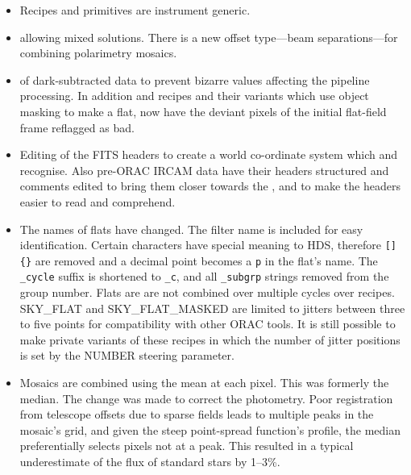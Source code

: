 \documentclass[twoside,11pt,nolof]{starlink}
\providecommand{\GAIA}{{\footnotesize GAIA}}
\providecommand{\KAPPA}{{\footnotesize KAPPA}}
\begin{document}
\begin{itemize}
   \item Recipes and primitives are instrument generic.
   \item {} allowing
      mixed solutions.  There is a new offset type---beam
      separa\-tions---for combining polarimetry mosaics.
   \item {} of dark-subtracted data
      to prevent bizarre values affecting the pipeline processing.
      In addition  and
       recipes and their variants which
      use object masking to make a flat, now have the deviant pixels of
      the initial flat-field frame reflagged as bad.
   \item Editing of the FITS headers to create a world co-ordinate
      system which \xref{\GAIA}{sun214}{} and \xref{\KAPPA}{sun95}{}
      recognise.  Also pre-ORAC IRCAM data have their headers
      structured and comments edited to bring them closer towards the
      ,
      and to make the headers easier to read and comprehend.
   \item The names of flats have changed.  The filter name is included
      for easy identification.  Certain characters have special
      meaning to HDS, therefore \texttt{[]\{\}} are removed and a decimal
      point becomes a \texttt{p} in the flat's name.  The {\tt{\_cycle}}
      suffix is shortened to {\tt{\_c}}, and all {\tt{\_subgrp}}
      strings removed from the group number.  Flats are are not
      combined over multiple cycles over recipes.  SKY\_FLAT and
      SKY\_FLAT\_MASKED are limited to jitters between three to five
      points for compatibility with other ORAC tools.  It is still
      possible to make private variants of these recipes in which the
      number of jitter positions is set by the NUMBER steering
      parameter.
   \item Mosaics are combined using the mean at each pixel.  This was
      formerly the median.  The change was made to correct the
      photometry.  Poor registration from telescope offsets due to
      sparse fields leads to multiple peaks in the mosaic's grid, and
      given the steep point-spread function's profile, the median
      preferentially selects pixels not at a peak.  This resulted in a
      typical underestimate of the flux of standard stars by 1--3\%.

\end{itemize}
\end{document}
